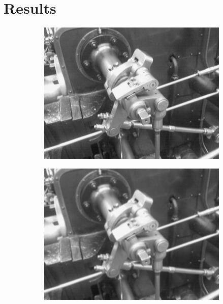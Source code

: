 \documentclass[12pt]{article}
\begin{document}
	\section{Results}
		\label{sec:results}
		\begin{figure}[H]
			\centering
			\begin{subfigure}[b]{0.45\linewidth}
				\includegraphics[width=1\linewidth,keepaspectratio]{../examples/valve/valve_gaussian-3x3}
				\subcaption{}
				\label{fig:gaussianCmp3x3}
			\end{subfigure} %
			\begin{subfigure}[b]{0.45\linewidth}
				\includegraphics[width=1\linewidth,keepaspectratio]{../examples/valve/valve_gaussian-5x5}
				\subcaption{}

\end{subfigure}
\end{figure}
\end{document}
